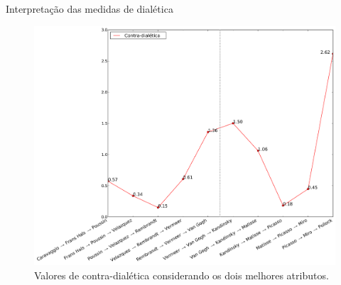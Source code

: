 \documentclass{beamer}
\begin{document}







\begin{frame}{Interpretação das medidas de dialética}
  \begin{figure}[h!]
\begin{center}
        \includegraphics[width=.7\textwidth]{figs/caso1_dialetica}
         \caption{Valores de contra-dialética considerando os dois melhores atributos.}
        \label{fig:caso1_dialetica}
\end{center}
\end{figure}
\end{frame}
\end{document}
